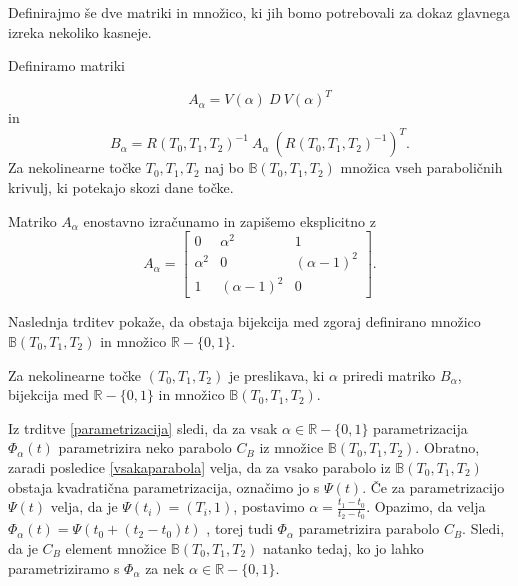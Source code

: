 \documentclass[mat1]{fmfdelo}
\newcommand{\R}{\mathbb R}
\newcommand{\B}{\mathbb B}
\newcommand{\al}{\alpha}
\begin{document}
Definirajmo še dve matriki in množico, ki jih bomo potrebovali za dokaz glavnega izreka nekoliko kasneje.

\begin{definicija}\label{aalfa}
Definiramo matriki

$$A_{\al} = V(\al) \ D \ V(\al)^T $$
in
$$B_{\al} =  R(T_0, T_1, T_2)^{-1}\  A_{\al} \  (R(T_0, T_1, T_2)^{-1})^T.$$
Za nekolinearne točke $T_0, T_1, T_2$ naj bo $\B(T_0, T_1, T_2)$ množica vseh paraboličnih krivulj, ki potekajo skozi dane točke.

\end{definicija}

\begin{opomba}
Matriko $A_\al$ enostavno izračunamo in zapišemo eksplicitno z %
$$A_\al = 
\begin{bmatrix}
0 & \al^2 & 1 \\
\al^2 & 0 & (\al - 1)^2 \\
1 & (\al -1)^2 & 0
\end{bmatrix}
.$$

\end{opomba}

Naslednja trditev pokaže, da obstaja bijekcija med zgoraj definirano množico $\B(T_0, T_1, T_2)$ in množico $\R - \{0, 1\}$.

\begin{trditev}
Za nekolinearne točke $(T_0, T_1, T_2)$ je preslikava, ki $\al$ priredi matriko $B_{\al}$, bijekcija med $\R - \{0, 1\}$ in množico $\B(T_0, T_1, T_2)$.
\end{trditev}





\begin{dokaz}
Iz trditve \ref{parametrizacija} sledi, da za vsak $\al \in \R - \{0,1 \}$ parametrizacija $\Phi_\al(t)$ parametrizira neko parabolo $C_B$ iz množice $\B(T_0, T_1, T_2)$.
Obratno, zaradi posledice \ref{vsakaparabola} velja, da za vsako parabolo iz $\B(T_0, T_1, T_2)$ obstaja kvadratična parametrizacija, označimo jo s $\Psi(t)$.
Če za parametrizacijo $\Psi(t)$ velja, da je $\Psi(t_i) = (T_i, 1)$, postavimo $\al = \frac{t_1 - t_0}{t_2 - t_0}$.
Opazimo, da velja $\Phi_\al(t) = \Psi(t_0 + (t_2 - t_0)t)$ 
, torej tudi $\Phi_\al$ parametrizira parabolo $C_B$. Sledi, da je $C_B$ element množice $\B(T_0, T_1, T_2)$ natanko tedaj, ko jo lahko parametriziramo s $\Phi_\al$ za nek $\al \in \R - \{0,1 \}$.
\end{dokaz}
\end{document}
